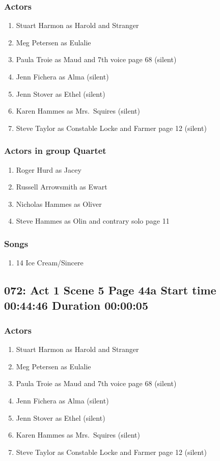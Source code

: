 \subsubsection{Actors}
\begin{enumerate}
\item Stuart Harmon as Harold and Stranger
\item Meg Petersen as Eulalie
\item Paula Troie as Maud and 7th voice page 68 (silent)
\item Jenn Fichera as Alma (silent)
\item Jenn Stover as Ethel (silent)
\item Karen Hammes as Mrs.~Squires (silent)
\item Steve Taylor as Constable Locke and Farmer page 12 (silent)
\end{enumerate}
\subsubsection{Actors in group Quartet}
\begin{enumerate}
\item Roger Hurd as Jacey
\item Russell Arrowsmith as Ewart
\item Nicholas Hammes as Oliver
\item Steve Hammes as Olin and contrary solo page 11
\end{enumerate}

\subsubsection{Songs}
\begin{enumerate}
\item 14 Ice Cream/Sincere
\end{enumerate}
\subsection{072: Act 1 Scene 5 Page 44a Start time 00:44:46 Duration 00:00:05}

\subsubsection{Actors}
\begin{enumerate}
\item Stuart Harmon as Harold and Stranger
\item Meg Petersen as Eulalie
\item Paula Troie as Maud and 7th voice page 68 (silent)
\item Jenn Fichera as Alma (silent)
\item Jenn Stover as Ethel (silent)
\item Karen Hammes as Mrs.~Squires (silent)
\item Steve Taylor as Constable Locke and Farmer page 12 (silent)
\end{enumerate}
